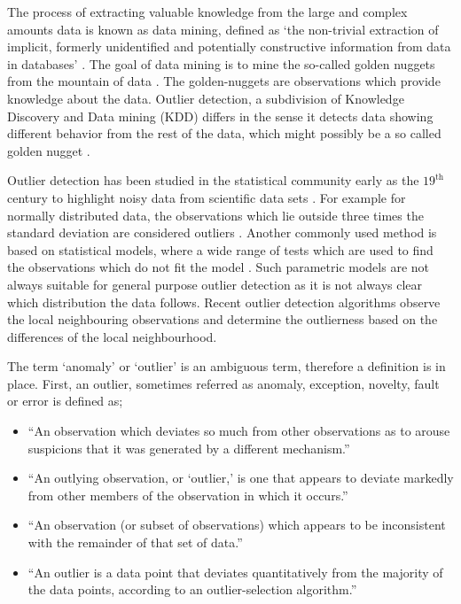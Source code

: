 The process of extracting valuable knowledge from the large and complex amounts data is known as data mining, defined as `the non-trivial extraction of implicit, formerly unidentified and potentially constructive information from data in databases' \cite{Zaiane99introductionto,Kantardzic:2002:DMC:581837}. The goal of data mining is to mine the so-called golden nuggets from the mountain of data \cite{1347303}. The golden-nuggets are observations which provide knowledge about the data. Outlier detection, a subdivision of Knowledge Discovery and Data mining (KDD) differs in the sense it detects data showing different behavior from the rest of the data, which might possibly be a so called golden nugget \cite{Chandola:2009:ADS:1541880.1541882}. 

Outlier detection has been studied in the statistical community early as the $19^{\text{th}}$ century to highlight noisy data from scientific data sets \cite{14786448708628471}. For example for normally distributed data, the observations which lie outside three times the standard deviation are considered outliers \cite{9783540262565}. Another commonly used method is based on statistical models, where a wide range of tests which are used to find the observations which do not fit the model \cite{barnett1994outliers}. Such parametric models are not always suitable for general purpose outlier detection as it is not always clear which distribution the data follows. Recent outlier detection algorithms observe the local neighbouring observations and determine the outlierness based on the differences of the local neighbourhood.

The term `anomaly' or `outlier' is an ambiguous term, therefore a definition is in place. First, an outlier, sometimes referred as anomaly, exception, novelty, fault or error is defined as;
\begin{itemize}
  \item ``An observation which deviates so much from other observations as to arouse suspicions that it was generated by a different mechanism.'' \cite{Enderlein1987}
  \item ``An outlying observation, or ‘outlier,’ is one that appears to deviate markedly from other members of the observation in which it occurs.'' \cite{Grubbs1969}
  \item ``An observation (or subset of observations) which appears to be inconsistent with the remainder of that set of data.'' \cite{barnett1994outliers}
  \item ``An outlier is a data point that deviates quantitatively from the majority of the data points, according to an outlier-selection algorithm.'' \cite{outlierselection}
\end{itemize}

